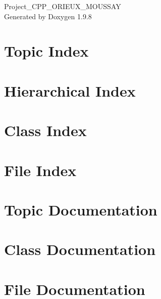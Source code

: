 \documentclass[twoside]{book}
\newcommand{\+}{\discretionary{\mbox{\scriptsize$\hookleftarrow$}}{}{}}
\newcommand{\clearemptydoublepage}{%
    \newpage{\pagestyle{empty}\cleardoublepage}%
  }
\begin{document}
  \raggedbottom
    \hypersetup{pageanchor=false,
                bookmarksnumbered=true,
                pdfencoding=unicode
               }
  \begin{titlepage}
  \vspace*{7cm}
  \begin{center}%
  {\Large Project\+\_\+\+CPP\+\_\+\+ORIEUX\+\_\+\+MOUSSAY}\\
  \vspace*{1cm}
  {\large Generated by Doxygen 1.9.8}\\
  \end{center}
  \end{titlepage}
  \clearemptydoublepage
  \tableofcontents
  \clearemptydoublepage
  \hypersetup{pageanchor=true}
\chapter{Topic Index}

\chapter{Hierarchical Index}

\chapter{Class Index}

\chapter{File Index}

\chapter{Topic Documentation}


\chapter{Class Documentation}





\chapter{File Documentation}























  \backmatter
  \newpage
  \clearemptydoublepage
  \printindex
\end{document}
